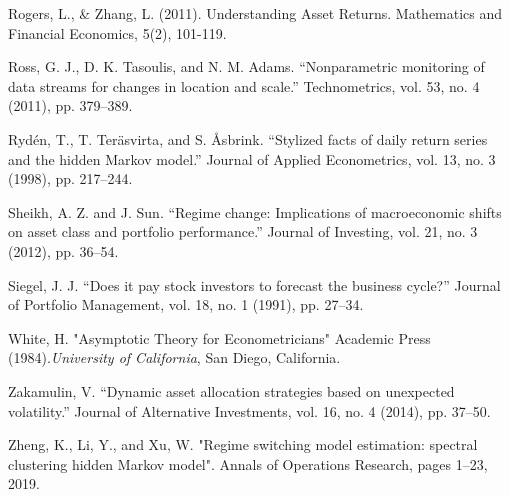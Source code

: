 Rogers, L., \& Zhang, L. (2011). Understanding Asset Returns. Mathematics and Financial Economics,
5(2), 101-119.

Ross, G. J., D. K. Tasoulis, and N. M. Adams. “Nonparametric monitoring of data streams for changes in location and scale.” Technometrics, vol. 53, no. 4 (2011), pp. 379–389.

Rydén, T., T. Teräsvirta, and S. Åsbrink. “Stylized facts of daily return series and the hidden Markov model.” Journal of Applied Econometrics, vol. 13, no. 3 (1998), pp. 217–244.

Sheikh, A. Z. and J. Sun. “Regime change: Implications of macroeconomic shifts on asset class and portfolio performance.” Journal of Investing, vol. 21, no. 3 (2012), pp. 36–54.

Siegel, J. J. “Does it pay stock investors to forecast the business cycle?” Journal of Portfolio Management, vol. 18, no. 1 (1991), pp. 27–34.

White, H. "Asymptotic Theory for Econometricians" Academic Press (1984).\textit{University of California}, San Diego, California.

Zakamulin, V. “Dynamic asset allocation strategies based on unexpected volatility.” Journal of Alternative Investments, vol. 16, no. 4 (2014), pp. 37–50.

Zheng, K., Li, Y., and Xu, W. "Regime switching model estimation: spectral clustering hidden Markov model". Annals of Operations Research, pages 1–23, 2019.









